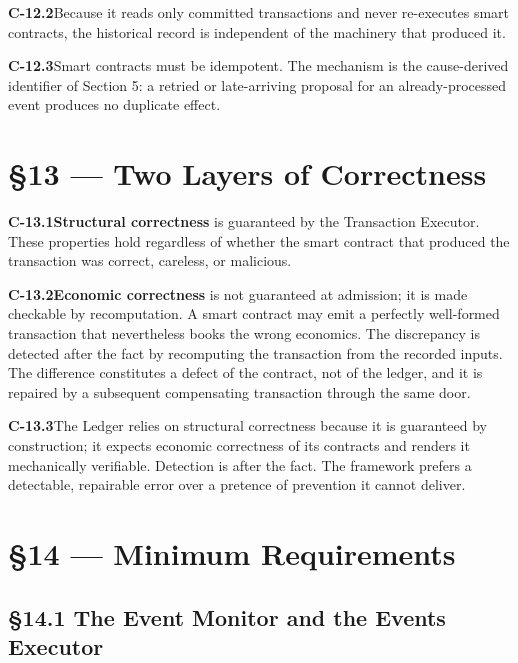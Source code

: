 \documentclass[11pt,a4paper]{article}
\newcommand{\clause}[2]{\par\medskip\noindent\textbf{#1}\hspace{0.6em}#2}
\begin{document}
\clause{C-12.2}{Because it reads only committed transactions and never re-executes
smart contracts, the historical record is independent of the machinery that
produced it.}

\clause{C-12.3}{Smart contracts must be idempotent. The mechanism is the
cause-derived identifier of Section 5: a retried or late-arriving proposal for an
already-processed event produces no duplicate effect.}

\section*{\S13 --- Two Layers of Correctness}

\clause{C-13.1}{\textbf{Structural correctness} is guaranteed by the Transaction
Executor. These properties hold regardless of whether the smart contract that
produced the transaction was correct, careless, or malicious.}

\clause{C-13.2}{\textbf{Economic correctness} is not guaranteed at admission; it is
made checkable by recomputation. A smart contract may emit a perfectly well-formed
transaction that nevertheless books the wrong economics. The discrepancy is
detected after the fact by recomputing the transaction from the recorded inputs.
The difference constitutes a defect of the contract, not of the ledger, and it is
repaired by a subsequent compensating transaction through the same door.}

\clause{C-13.3}{The Ledger relies on structural correctness because it is
guaranteed by construction; it expects economic correctness of its contracts and
renders it mechanically verifiable. Detection is after the fact. The framework
prefers a detectable, repairable error over a pretence of prevention it cannot
deliver.}

\section*{\S14 --- Minimum Requirements}

\subsection*{\S14.1 The Event Monitor and the Events Executor}
\end{document}
